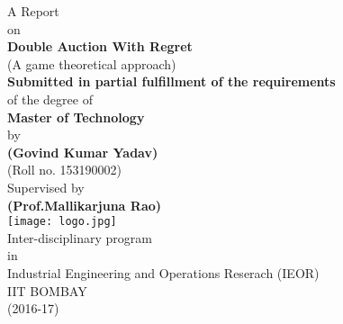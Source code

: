 \begin{titlepage}
\begin{center}
	\vspace*{1cm}
	\Large
	A Report\\
	\vspace{0.5cm}
	\Large
	on\\
	\vspace{0.5cm}
	\Huge
	\textbf{Double Auction With Regret}\\
	\vspace{0.5cm}
	\LARGE
	(A game theoretical approach)\\
	\vspace{1.5cm}
	\Large
	\textbf{Submitted in partial fulfillment of the requirements}\\
	\vspace{0.5cm}
	\Large
	of  the degree of\\
	\vspace{0.5cm}
	\Large
	\textbf{Master of Technology}\\
	\vspace{0.5cm}
	\Large
	by\\
	\vspace{0.2cm}
	\Large
	\textbf{(Govind Kumar Yadav)}\\
	
	\Large
	(Roll no. 153190002)\\
	\vspace{0.5cm}
	\Large
	Supervised by\\
	\vspace{0.2cm}
	\Large
	\textbf{(Prof.Mallikarjuna Rao)}\\
	\vspace{0.8cm}
	{\texttt{[image: logo.jpg]}}\\
	\Large
	Inter-disciplinary program\\
	\Large
	in\\
	\Large
	Industrial Engineering and Operations Reserach (IEOR)\\
	\Large
	IIT BOMBAY\\
	\Large
		(2016-17)
\end{center}
\end{titlepage}